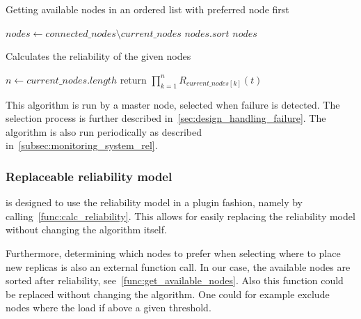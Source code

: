 \documentclass{cslthse-msc}
\begin{document}
\begin{function} 
	\caption{Getting available nodes in an ordered list with preferred node first} \label{func:get_available_nodes}
	\begin{algorithmic}[1]
	\Statex
	    \State $nodes\gets connected\_nodes \setminus current\_nodes$
	    \State $nodes.sort$
	    \State \Return $nodes$
	\EndFunction
	\end{algorithmic}
\end{function}

\begin{function} 
	\caption{Calculates the reliability of the given nodes} \label{func:calc_reliability}
	\begin{algorithmic}[1]
	\Statex
		\State $n\gets current\_nodes.length$
		\State return $ \prod\limits_{k=1}^n R_{current\_nodes[k]}(t)$
	\EndFunction
	\end{algorithmic}
\end{function}

This algorithm is run by a master node, selected when failure is detected. The selection process is further described in~\cref{sec:design_handling_failure}. The algorithm is also run periodically as described in~\cref{subsec:monitoring_system_rel}.

\subsubsection{Replaceable reliability model}
 is designed to use the reliability model in a plugin fashion, namely by calling~\cref{func:calc_reliability}. This allows for easily replacing the reliability model without changing the algorithm itself.

Furthermore, determining which nodes to prefer when selecting where to place new replicas is also an external function call. In our case, the available nodes are sorted after reliability, see~\cref{func:get_available_nodes}. Also this function could be replaced without changing the algorithm. One could for example exclude nodes where the load if above a given threshold.
\end{document}
